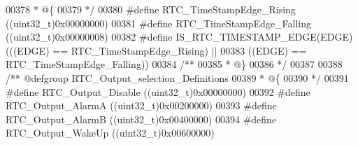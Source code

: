 \begin{DoxyCode}
00378 \textcolor{comment}{  * @\{}
00379 \textcolor{comment}{  */}
00380 \textcolor{preprocessor}{#}\textcolor{preprocessor}{define} \textcolor{preprocessor}{RTC\_TimeStampEdge\_Rising}          \textcolor{preprocessor}{(}\textcolor{preprocessor}{(}\textcolor{preprocessor}{uint32\_t}\textcolor{preprocessor}{)}0x00000000\textcolor{preprocessor}{)}
00381 \textcolor{preprocessor}{#}\textcolor{preprocessor}{define} \textcolor{preprocessor}{RTC\_TimeStampEdge\_Falling}         \textcolor{preprocessor}{(}\textcolor{preprocessor}{(}\textcolor{preprocessor}{uint32\_t}\textcolor{preprocessor}{)}0x00000008\textcolor{preprocessor}{)}
00382 \textcolor{preprocessor}{#}\textcolor{preprocessor}{define} \textcolor{preprocessor}{IS\_RTC\_TIMESTAMP\_EDGE}\textcolor{preprocessor}{(}\textcolor{preprocessor}{EDGE}\textcolor{preprocessor}{)} \textcolor{preprocessor}{(}\textcolor{preprocessor}{(}\textcolor{preprocessor}{(}\textcolor{preprocessor}{EDGE}\textcolor{preprocessor}{)} \textcolor{preprocessor}{==} RTC_TimeStampEdge_Rising\textcolor{preprocessor}{)} \textcolor{preprocessor}{||}
00383                                      \textcolor{preprocessor}{(}\textcolor{preprocessor}{(}\textcolor{preprocessor}{EDGE}\textcolor{preprocessor}{)} \textcolor{preprocessor}{==} RTC_TimeStampEdge_Falling\textcolor{preprocessor}{)}\textcolor{preprocessor}{)}
00384 \textcolor{comment}{/**}
00385 \textcolor{comment}{  * @\}}
00386 \textcolor{comment}{  */}
00387 
00388 \textcolor{comment}{/** @defgroup RTC\_Output\_selection\_Definitions }
00389 \textcolor{comment}{  * @\{}
00390 \textcolor{comment}{  */}
00391 \textcolor{preprocessor}{#}\textcolor{preprocessor}{define} \textcolor{preprocessor}{RTC\_Output\_Disable}             \textcolor{preprocessor}{(}\textcolor{preprocessor}{(}\textcolor{preprocessor}{uint32\_t}\textcolor{preprocessor}{)}0x00000000\textcolor{preprocessor}{)}
00392 \textcolor{preprocessor}{#}\textcolor{preprocessor}{define} \textcolor{preprocessor}{RTC\_Output\_AlarmA}              \textcolor{preprocessor}{(}\textcolor{preprocessor}{(}\textcolor{preprocessor}{uint32\_t}\textcolor{preprocessor}{)}0x00200000\textcolor{preprocessor}{)}
00393 \textcolor{preprocessor}{#}\textcolor{preprocessor}{define} \textcolor{preprocessor}{RTC\_Output\_AlarmB}              \textcolor{preprocessor}{(}\textcolor{preprocessor}{(}\textcolor{preprocessor}{uint32\_t}\textcolor{preprocessor}{)}0x00400000\textcolor{preprocessor}{)}
00394 \textcolor{preprocessor}{#}\textcolor{preprocessor}{define} \textcolor{preprocessor}{RTC\_Output\_WakeUp}              \textcolor{preprocessor}{(}\textcolor{preprocessor}{(}\textcolor{preprocessor}{uint32\_t}\textcolor{preprocessor}{)}0x00600000\textcolor{preprocessor}{)}

\end{DoxyCode}
